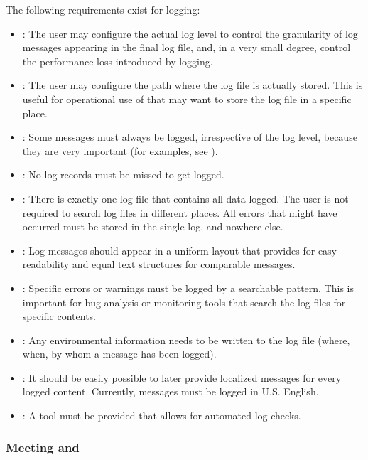 The following requirements exist for logging:
\begin{itemize}
	\item \REQUlogLevelConfig{}: The user may configure the actual log level to control the granularity of log messages appearing in the final log file, and, in a very small degree, control the performance loss introduced by logging.
	\item \REQUlogFilePathConfig{}: The user may configure the path where the log file is actually stored. This is useful for operational use of \LibName{} that may want to store the log file in a specific place.
	\item \REQUlogForcedLogging{}: Some messages must always be logged, irrespective of the log level, because they are very important (for examples, see ). 
	\item \REQUlogNoMissedRecords{}: No log records must be missed to get logged.
	\item \REQUlogOneLogfile{}: There is exactly one log file that contains all data logged. The user is not required to search log files in different places. All errors that might have occurred must be stored in the single log, and nowhere else.
	\item \REQUlogUniLayout{}: Log messages should appear in a uniform layout that provides for easy readability and equal text structures for comparable messages.
	\item \REQUlogSearchPatterns{}: Specific errors or warnings must be logged by a searchable pattern. This is important for bug analysis or monitoring tools that search the log files for specific contents. 
	\item \REQUlogAnalysisInformation{}: Any environmental information needs to be written to the log file (where, when, by whom a message has been logged).
	\item \REQUlogPreparedLocalisation{}: It should be easily possible to later provide localized messages for every logged content. Currently, messages must be logged in U.S. English.
	\item \REQUlogTestability{}: A tool must be provided that allows for automated log checks.
\end{itemize}


\subsubsection{Meeting \REQUlogLevelConfig{} and \REQUlogFilePathConfig{}}
\label{sec:MeetingREQUlogLevelConfig}

